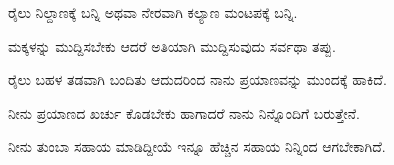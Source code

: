 \vspace{2.5pt plus 3pt minus 0.5pt}\noindent\hspace*{1.2em}\hspace{0.55em}ರೈಲು ನಿಲ್ದಾಣಕ್ಕೆ ಬನ್ನಿ ಅಥವಾ ನೇರವಾಗಿ ಕಲ್ಯಾಣ ಮಂಟಪಕ್ಕೆ ಬನ್ನಿ.\par

\vspace{2.5pt plus 3pt minus 0.5pt}\noindent\hspace*{1.2em}\hspace{0.55em}ಮಕ್ಕಳನ್ನು ಮುದ್ದಿಸಬೇಕು ಆದರೆ ಅತಿಯಾಗಿ ಮುದ್ದಿಸುವುದು ಸರ್ವಥಾ ತಪ್ಪು.\par

\vspace{2.5pt plus 3pt minus 0.5pt}\noindent\hspace*{1.2em}\hspace{0.55em}ರೈಲು ಬಹಳ ತಡವಾಗಿ ಬಂದಿತು ಆದುದರಿಂದ ನಾನು ಪ್ರಯಾಣವನ್ನು ಮುಂದಕ್ಕೆ ಹಾಕಿದೆ.\par

\vspace{2.5pt plus 3pt minus 0.5pt}\noindent\hspace*{1.2em}\hspace{0.55em}ನೀನು ಪ್ರಯಾಣದ ಖರ್ಚು ಕೊಡಬೇಕು ಹಾಗಾದರೆ ನಾನು ನಿನ್ನೊಂದಿಗೆ ಬರುತ್ತೇನೆ.\par

\vspace{2.5pt plus 3pt minus 0.5pt}\noindent\hspace*{1.2em}\hspace{0.55em}ನೀನು ತುಂಬಾ ಸಹಾಯ ಮಾಡಿದ್ದೀಯೆ ಇನ್ನೂ ಹೆಚ್ಚಿನ ಸಹಾಯ ನಿನ್ನಿಂದ ಆಗಬೇಕಾಗಿದೆ.\par




